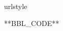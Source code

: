 \def\polhk#1{\setbox0=\hbox{#1}{\ooalign{\hidewidth
  \lower1.5ex\hbox{`}\hidewidth\crcr\unhbox0}}}
\begin{thebibliography}{661}
\providecommand{\natexlab}[1]{#1}
\providecommand{\url}[1]{\texttt{#1}}
\expandafter\ifx\csname urlstyle\endcsname\relax
  \providecommand{\doi}[1]{doi: #1}\else
  \providecommand{\doi}{doi: \begingroup \urlstyle{rm}\Url}\fi


**BBL_CODE**

\end{thebibliography}

